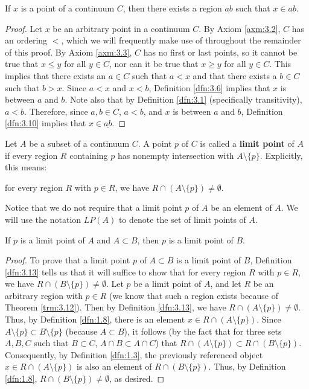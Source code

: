 \documentclass[../main.tex]{subfiles}
\begin{document}
\begin{theorem}\label{trm:3.12}
    If $x$ is a point of a continuum $C$, then there exists a region $\underline{ab}$ such that $x\in\underline{ab}$.
    \begin{proof}
        Let $x$ be an arbitrary point in a continuum $C$. By Axiom \ref{axm:3.2}, $C$ has an ordering $<$, which we will frequently make use of throughout the remainder of this proof. By Axiom \ref{axm:3.3}, $C$ has no first or last points, so it cannot be true that $x\leq y$ for all $y\in C$, nor can it be true that $x\geq y$ for all $y\in C$. This implies that there exists an $a\in C$ such that $a<x$ and that there exists a $b\in C$ such that $b>x$. Since $a<x$ and $x<b$, Definition \ref{dfn:3.6} implies that $x$ is between $a$ and $b$. Note also that by Definition \ref{dfn:3.1} (specifically transitivity), $a<b$. Therefore, since $a,b\in C$, $a<b$, and $x$ is between $a$ and $b$, Definition \ref{dfn:3.10} implies that $x\in\underline{ab}$.
    \end{proof}
\end{theorem}

\begin{definition}\label{dfn:3.13}
    Let $A$ be a subset of a continuum $C$. A point $p$ of $C$ is called a \textbf{limit point} of $A$ if every region $R$ containing $p$ has nonempty intersection with $A\setminus\{p\}$. Explicitly, this means:
    \begin{center}
        for every region $R$ with $p\in R$, we have $R\cap(A\setminus\{p\})\neq\emptyset$.
    \end{center}
    Notice that we do not require that a limit point $p$ of $A$ be an element of $A$. We will use the notation $LP(A)$ to denote the set of limit points of $A$.
\end{definition}

\begin{theorem}\label{trm:3.14}
    If $p$ is a limit point of $A$ and $A\subset B$, then $p$ is a limit point of $B$.
    \begin{proof}
        To prove that a limit point $p$ of $A\subset B$ is a limit point of $B$, Definition \ref{dfn:3.13} tells us that it will suffice to show that for every region $R$ with $p\in R$, we have $R\cap(B\setminus\{p\})\neq\emptyset$. Let $p$ be a limit point of $A$, and let $R$ be an arbitrary region with $p\in R$ (we know that such a region exists because of Theorem \ref{trm:3.12}). Then by Definition \ref{dfn:3.13}, we have $R\cap(A\setminus\{p\})\neq\emptyset$. Thus, by Definition \ref{dfn:1.8}, there is an element $x\in R\cap(A\setminus\{p\})$. Since $A\setminus\{p\}\subset B\setminus\{p\}$ (because $A\subset B$), it follows (by the fact that for three sets $A,B,C$ such that $B\subset C$, $A\cap B\subset A\cap C$) that $R\cap(A\setminus\{p\})\subset R\cap(B\setminus\{p\})$. Consequently, by Definition \ref{dfn:1.3}, the previously referenced object $x\in R\cap(A\setminus\{p\})$ is also an element of $R\cap(B\setminus\{p\})$. Thus, by Definition \ref{dfn:1.8}, $R\cap(B\setminus\{p\})\neq\emptyset$, as desired.
    \end{proof}
\end{theorem}
\end{document}
